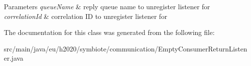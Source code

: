 \begin{DoxyParams}{Parameters}
{\em queue\+Name} & reply queue name to unregister listener for \\
\hline
{\em correlation\+Id} & correlation ID to unregister listener for \\
\hline
\end{DoxyParams}


The documentation for this class was generated from the following file\+:\begin{DoxyCompactItemize}
\item 
src/main/java/eu/h2020/symbiote/communication/Empty\+Consumer\+Return\+Listener.\+java\end{DoxyCompactItemize}
